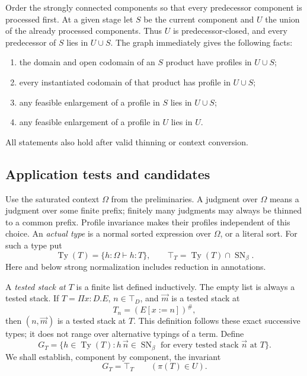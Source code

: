 Order the strongly connected components so that every predecessor
component is processed first. At a given stage let $S$ be the current
component and $U$ the union of the already processed components.
Thus $U$ is predecessor-closed, and every predecessor of $S$ lies in
$U\cup S$. The graph immediately gives the following facts:
\begin{enumerate}
\item the domain and open codomain of an $S$ product have profiles
      in $U\cup S$;
\item every instantiated codomain of that product has profile in
      $U\cup S$;
\item any feasible enlargement of a profile in $S$ lies in $U\cup S$;
\item any feasible enlargement of a profile in $U$ lies in $U$.
\end{enumerate}
All statements also hold after valid thinning or context conversion.

\subsection{Application tests and candidates}

Use the saturated context $\Omega$ from the preliminaries. A judgment
over $\Omega$ means a judgment over some finite prefix; finitely many
judgments may always be thinned to a common prefix. Profile invariance
makes their profiles independent of this choice. An \emph{actual
type} is a normal sorted expression over $\Omega$, or a literal sort.
For such a type put
\[
 \operatorname{Ty}(T)=\{h:\Omega\vdash h:T\},\qquad
 \top_T=\operatorname{Ty}(T)\cap\operatorname{SN}_\beta.
\]
Here and below strong normalization includes reduction in annotations.

A \emph{tested stack at $T$} is a finite list defined inductively.
The empty list is always a tested stack. If $T=\Pi x:D.E$,
$n\in\top_D$, and $\vec m$ is a tested stack at
\[
                     T_n=(E[x:=n])^\#,
\]
then $(n,\vec m)$ is a tested stack at $T$. This definition follows
these exact successive types; it does not range over alternative
typings of a term. Define
\[
 G_T=\{h\in\operatorname{Ty}(T):
            h\,\vec n\in\operatorname{SN}_\beta
            \text{ for every tested stack }\vec n\text{ at }T\}.
\]
We shall establish, component by component, the invariant
\begin{equation}
                    G_T=\top_T\qquad(\pi(T)\in U).
\label{eq:processed-invariant}
\end{equation}

